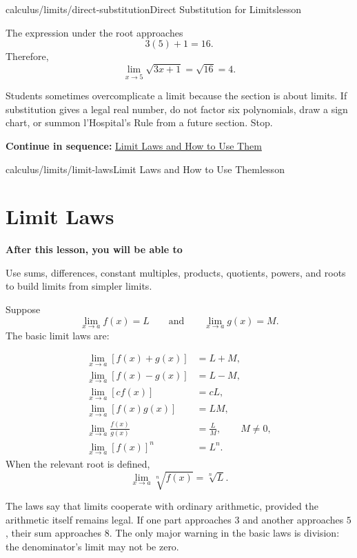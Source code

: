 \documentclass[11pt,openany]{book}
\theoremstyle{bgplain}
\newcounter{bgexample}[chapter]
\newcommand{\webnext}[2]{%
  \par\addvspace{1.2em}\noindent{\color{BGLine}\rule{\textwidth}{0.35pt}}\par\smallskip
  {\small\color{BGGray}\textbf{Continue in sequence:} \hyperlink{web:#1}{#2}}\par
}
\newcommand{\lessonobjective}[1]{%
  \par\Needspace{4\baselineskip}\addvspace{0.6em}%
  {\bfseries\color{BGInk}After this lesson, you will be able to}\par\smallskip
  #1\par\addvspace{0.5em}%
}
\begin{document}
\begin{webpage}{calculus/limits/direct-substitution}{Direct Substitution for Limits}{lesson}
\begin{bgexample}[title={A root function}]
\begin{bgsolution}
The expression under the root approaches
\[
  3(5)+1=16.
\]
Therefore,
\[
  \lim_{x\to5}\sqrt{3x+1}=\sqrt{16}=\boxed{4}.
\]
\end{bgsolution}
\end{bgexample}

\begin{bgmistake}
Students sometimes overcomplicate a limit because the section is about limits. If substitution gives a legal real number, do not factor six polynomials, draw a sign chart, or summon l'Hospital's Rule from a future section. Stop.
\end{bgmistake}
\webnext{calculus/limits/limit-laws}{Limit Laws and How to Use Them}
\end{webpage}

\begin{webpage}{calculus/limits/limit-laws}{Limit Laws and How to Use Them}{lesson}
\section{Limit Laws}

\lessonobjective{
Use sums, differences, constant multiples, products, quotients, powers, and roots to build limits from simpler limits.
}

Suppose
\[
  \lim_{x\to a}f(x)=L
  \qquad\text{and}\qquad
  \lim_{x\to a}g(x)=M.
\]
The basic limit laws are:

\begin{bgtheorem}[title={Limit Laws}]
\begin{align*}
\lim_{x\to a}[f(x)+g(x)]&=L+M,\\
\lim_{x\to a}[f(x)-g(x)]&=L-M,\\
\lim_{x\to a}[cf(x)]&=cL,\\
\lim_{x\to a}[f(x)g(x)]&=LM,\\
\lim_{x\to a}\frac{f(x)}{g(x)}&=\frac{L}{M},\qquad M\ne0,\\
\lim_{x\to a}[f(x)]^n&=L^n.
\end{align*}
When the relevant root is defined,
\[
  \lim_{x\to a}\sqrt[n]{f(x)}=\sqrt[n]{L}.
\]
\end{bgtheorem}

\begin{bgconcept}
The laws say that limits cooperate with ordinary arithmetic, provided the arithmetic itself remains legal. If one part approaches \(3\) and another approaches \(5\), their sum approaches \(8\). The only major warning in the basic laws is division: the denominator's limit may not be zero.
\end{bgconcept}


\end{webpage}
\end{document}
